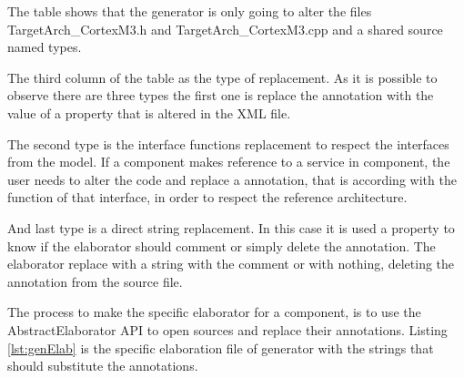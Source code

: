 The table shows that the generator is only going to alter the files TargetArch\_CortexM3.h and TargetArch\_CortexM3.cpp and a shared source named types.

The third column of the table as the type of replacement. As it is possible to observe there are three types the first one is replace the annotation with the value of a property that is altered in the XML file. 

The second type is the interface functions replacement to respect the interfaces from the model. If a component makes reference to a service in component, the user needs to alter the code and replace a annotation, that is according with the function of that interface, in order to respect the reference architecture. 

And last type is a direct string replacement. In this case it is used a property to know if the elaborator should comment or simply delete the annotation. The elaborator replace with a string with the comment or with nothing, deleting the annotation from the source file.

The process to make the specific elaborator for a component, is to use the AbstractElaborator API to open sources and replace their annotations. Listing \ref{lst:genElab} is the specific elaboration file of generator with the strings that should substitute the annotations. 

